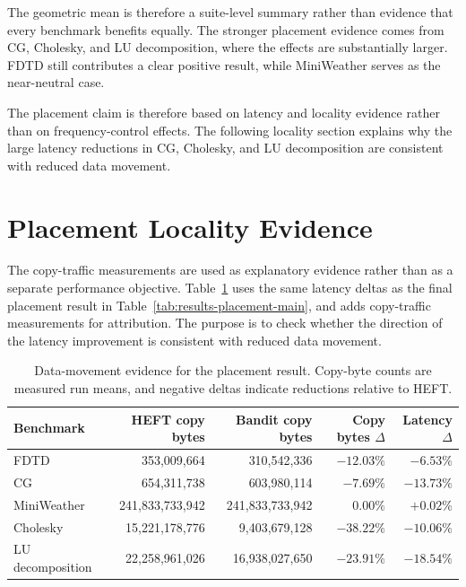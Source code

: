 The geometric mean is therefore a suite-level summary rather than evidence
that every benchmark benefits equally. The stronger placement evidence comes
from CG, Cholesky, and LU decomposition, where the effects are substantially
larger. FDTD still contributes a clear positive result, while MiniWeather
serves as the near-neutral case.

The placement claim is therefore based on latency and locality evidence rather
than on frequency-control effects. The following locality section explains why
the large latency reductions in CG, Cholesky, and LU decomposition are
consistent with reduced data movement.

\section{Placement Locality Evidence}
\label{sec:results-locality-attribution}

The copy-traffic measurements are used as explanatory evidence rather than as a
separate performance objective. Table~\ref{tab:results-locality-attribution}
uses the same latency deltas as the final placement result in
Table~\ref{tab:results-placement-main}, and adds copy-traffic measurements for
attribution. The purpose is to check whether the direction of the latency
improvement is consistent with reduced data movement.

\begin{table}[!htbp]
\centering
\begingroup
\scriptsize
\setlength{\tabcolsep}{4pt}
\begin{tabular}{@{}lrrrr@{}}
\toprule
Benchmark & HEFT copy bytes & Bandit copy bytes & Copy bytes \(\Delta\) & Latency \(\Delta\) \\
\midrule
FDTD & 353,009,664 & 310,542,336 & \(-12.03\%\) & \(-6.53\%\) \\
CG & 654,311,738 & 603,980,114 & \(-7.69\%\) & \(-13.73\%\) \\
MiniWeather & 241,833,733,942 & 241,833,733,942 & \(0.00\%\) & \(+0.02\%\) \\
Cholesky & 15,221,178,776 & 9,403,679,128 & \(-38.22\%\) & \(-10.06\%\) \\
LU decomposition & 22,258,961,026 & 16,938,027,650 & \(-23.91\%\) & \(-18.54\%\) \\
\bottomrule
\end{tabular}
\endgroup
\caption{Data-movement evidence for the placement result. Copy-byte counts are measured run means, and negative deltas indicate reductions relative to HEFT.}
\label{tab:results-locality-attribution}
\end{table}

